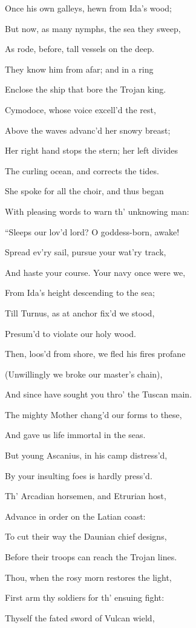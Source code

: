 Once his own galleys, hewn from Ida’s wood;

But now, as many nymphs, the sea they sweep,

As rode, before, tall vessels on the deep.

They know him from afar; and in a ring

Enclose the ship that bore the Trojan king.

Cymodoce, whose voice excell’d the rest,

Above the waves advanc’d her snowy breast;

Her right hand stops the stern; her left divides

The curling ocean, and corrects the tides.

She spoke for all the choir, and thus began

With pleasing words to warn th’ unknowing man:

“Sleeps our lov’d lord? O goddess-born, awake!

Spread ev’ry sail, pursue your wat’ry track,

And haste your course. Your navy once were we,

From Ida’s height descending to the sea;

Till Turnus, as at anchor fix’d we stood,

Presum’d to violate our holy wood.

Then, loos’d from shore, we fled his fires profane

(Unwillingly we broke our master’s chain),

And since have sought you thro’ the Tuscan main.

The mighty Mother chang’d our forms to these,

And gave us life immortal in the seas.

But young Ascanius, in his camp distress’d,

By your insulting foes is hardly press’d.

Th’ Arcadian horsemen, and Etrurian host,

Advance in order on the Latian coast:

To cut their way the Daunian chief designs,

Before their troops can reach the Trojan lines.

Thou, when the rosy morn restores the light,

First arm thy soldiers for th’ ensuing fight:

Thyself the fated sword of Vulcan wield,

